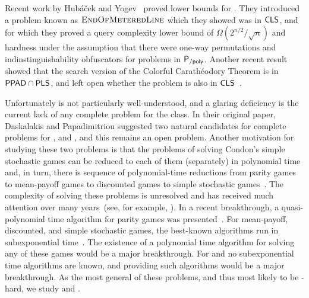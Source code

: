 
Recent work by Hub\'{a}\v{c}ek and Yogev~\cite{hubavcek2017hardness} proved 
lower bounds for \CLS. They introduced
a problem known as $\textsc{EndOfMeteredLine}$ which they showed was in $\mathsf{CLS}$, and for which they
proved a query complexity lower bound of $\Omega(2^{n/2}/\sqrt{n})$ and
hardness under the assumption that there were one-way permutations and
indinstinguishability obfuscators for problems in $\mathsf{P_{/poly}}$.
%
Another recent result showed that the search version of the Colorful
Carath\'eodory Theorem is in $\mathsf{PPAD} \cap \mathsf{PLS}$, and left open
whether the problem is also in $\mathsf{CLS}$~\cite{colorfulcara2017}.

Unfortunately \CLS is not particularly well-understood, and a glaring
deficiency is the current lack of any complete problem for the class. In their
original paper, Daskalakis and Papadimitriou suggested two natural candidates
for complete problems for \CLS, \ContractionMap and \PLCP, and this remains an
open problem.
Another motivation for studying these two problems is that the problems of
solving Condon's simple stochastic games can be reduced to each of them
(separately) in polynomial time
and, in turn, there is sequence of polynomial-time reductions from parity games 
to mean-payoff games to discounted games to simple stochastic 
games~\cite{puri1996theory,gartner2005simple,jurdzinski2008simple,zwick1996complexity,hansen2013complexity}.
The complexity of solving these problems is unresolved and has received 
much attention over many years~(see, for example, 
\cite{zwick1996complexity,condon1992complexity,fearnley2010linear,jurdzinski1998deciding,bjorklund2004combinatorial,fearnley2016complexity}).
In a recent breakthrough, a quasi-polynomial time algorithm for parity games
was presented~\cite{parity}.
For mean-payoff, discounted, and simple stochastic games, the best-known 
algorithms run in subexponential time~\cite{ludwig1995subexponential}.
The existence of a polynomial time algorithm for solving any of these games
would be a major breakthrough.
For \ContractionMap and \PLCP no subexponential time algorithms 
are known, and providing such algorithms would be a major breakthrough.
As the most general of these problems, and thus most likely to be 
\CLS-hard, we study \ContractionMap and \PLCP.

